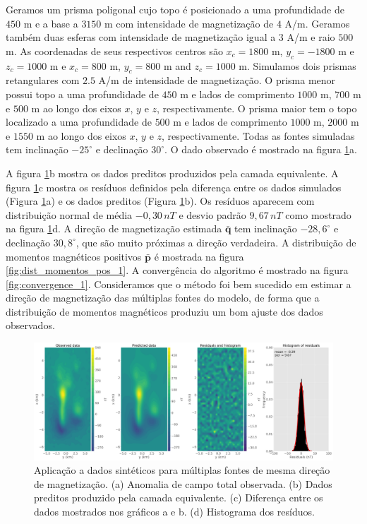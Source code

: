 Geramos um prisma poligonal cujo topo é posicionado a uma profundidade de $450$ m e a base a $3150$ m com intensidade de magnetização de $4$ A/m. Geramos também duas esferas com intensidade de magnetização igual a $3$ A/m e raio $500$ m. As coordenadas de seus respectivos centros são $x_c = 1800$ m, $y_c = -1800$ m e $z_c = 1000$ m e $x_c = 800$ m, $y_c = 800$ m and $z_c= 1000$ m. Simulamos dois prismas retangulares com $2.5$ A/m de intensidade de magnetização. O prisma menor possui topo a uma profundidade de $450$ m e lados de comprimento $1000$ m, $700$ m e $500$ m ao longo dos eixos $x$, $y$ e $z$, respectivamente. O prisma maior tem o topo localizado a uma profundidade de $500$ m e lados de comprimento $1000$ m, $2000$ m e $1550$ m ao longo dos eixos $x$, $y$ e $z$, respectivamente. Todas as fontes simuladas tem inclinação $-25^\circ$ e declinação $30^\circ$. O dado observado é mostrado na figura \ref{fig:data_fitting_1}a.

A figura \ref{fig:data_fitting_1}b mostra os dados preditos produzidos pela camada equivalente. A figura \ref{fig:data_fitting_1}c mostra os resíduos definidos pela diferença entre os dados simulados (Figura \ref{fig:data_fitting_1}a) e os dados preditos (Figura \ref{fig:data_fitting_1}b). Os resíduos aparecem com distribuição normal de média $-0,30 \, nT$ e desvio padrão $9,67 \, nT$ como mostrado na figura \ref{fig:data_fitting_1}d. A direção de magnetização estimada $\bar{\mathbf{q}}$ tem inclinação $-28,6^\circ$ e declinação $30,8^\circ$, que são muito próximas a direção verdadeira. A distribuição de momentos magnéticos positivos $\bar{\mathbf{p}}$ é mostrada na figura \ref{fig:dist_momentos_pos_1}. A convergência do algoritmo é mostrado na figura \ref{fig:convergence_1}. Consideramos que o método foi bem sucedido em estimar a direção de magnetização das múltiplas fontes do modelo, de forma que a distribuição de momentos magnéticos produziu um bom ajuste dos dados observados. 

\begin{figure}
	\centering
	\includegraphics[width=1.1\textwidth]{Fig/eqlayer/unidir_test/data_fitting_LM_NNLS_magRM.png}
	\caption{Aplicação a dados sintéticos para múltiplas fontes de mesma direção de magnetização. (a) Anomalia de campo total observada. (b) Dados preditos produzido pela camada equivalente. (c) Diferença entre os dados mostrados nos gráficos a e b. (d) Histograma dos resíduos.}
	\label{fig:data_fitting_1}
\end{figure}

